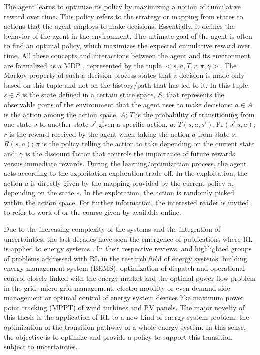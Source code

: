 The agent learns to optimize its policy by maximizing a notion of cumulative reward over time. This policy refers to the strategy or mapping from states to actions that the agent employs to make decisions. Essentially, it defines the behavior of the agent in the environment. The ultimate goal of the agent is often to find an optimal policy, which maximizes the expected cumulative reward over time.  All these concepts and interactions between the agent and its environment are formalized as a \gls{MDP} \cite{sutton2018reinforcement}, represented by the tuple $<s,a,T,r,\pi,\gamma>$.  The Markov property of such a decision process states that a decision is made only based on this tuple and not on the history/path that has led to it. In this tuple, $s\in S$ is the state defined in a certain state space, $S$, that represents the observable parts of the environment that the agent uses to make decisions; $a\in A$ is the action among the action space, $A$; $T$ is the probability of transitioning from one state $s$ to another state $s'$ given a specific action, $a$: $T(s,a,s'): \text{Pr}\left(s'|s,a\right)$; $r$ is the reward received by the agent when taking the action $a$ from state $s$, $R(s,a)$; $\pi$ is the policy telling the action to take depending on the current state and; $\gamma$ is the discount factor that controls the importance of future rewards versus immediate rewards. During the learning/optimization process, the agent acts according to the exploitation-exploration trade-off. In the exploitation, the action $a$ is directly given by the mapping provided by the current policy $\pi$,  depending on the state $s$. In the exploration, the action is randomly picked within the action space. For further information, the interested reader is invited to refer to work of \citet{sutton2018reinforcement} or the course given by \citet{davidsilver_RL_online} available online.

Due to the increasing complexity of the systems and the integration of uncertainties, the last decades have seen the emergence of publications where \gls{RL} is applied to energy systems \cite{cao2020reinforcement,perera2021applications}. In their respective reviews, \citet{cao2020reinforcement} and \citet{perera2021applications} highlighted groups of problems addressed with \gls{RL} in the research field of energy systems: building energy management system (BEMS), optimization of dispatch and operational control closely linked with the energy market and the optimal power flow problem in the grid, micro-grid management, electro-mobility or even demand-side management or optimal control of energy system devices like maximum power point tracking (MPPT) of wind turbines and \gls{PV} panels.  The major novelty of this thesis is the application of \gls{RL} to a new kind of energy system problem: the optimization of the transition pathway of a whole-energy system. In this sense, the objective is to optimize and provide a policy to support this transition subject to uncertainties.

